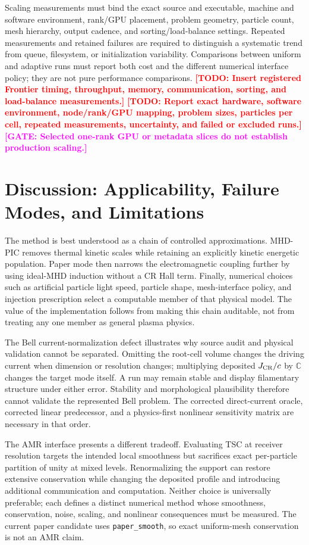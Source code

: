 \documentclass[twocolumn]{aastex701}
\newcommand{\TODO}[1]{\textcolor{red}{\textbf{[TODO: #1]}}}
\newcommand{\GATE}[1]{\textcolor{magenta}{\textbf{[GATE: #1]}}}
\begin{document}
Scaling measurements must bind the exact source and executable, machine and
software environment, rank/GPU placement, problem geometry, particle count,
mesh hierarchy, output cadence, and sorting/load-balance settings. Repeated
measurements and retained failures are required to distinguish a systematic
trend from queue, filesystem, or initialization variability. Comparisons
between uniform and adaptive runs must report both cost and the different
numerical interface policy; they are not pure performance comparisons.
\TODO{Insert registered Frontier timing, throughput, memory, communication,
sorting, and load-balance measurements.}
\TODO{Report exact hardware, software environment, node/rank/GPU mapping,
problem sizes, particles per cell, repeated measurements, uncertainty, and
failed or excluded runs.}
\GATE{Selected one-rank GPU or metadata slices do not establish production
scaling.}

\section{Discussion: Applicability, Failure Modes, and Limitations}
\label{sec:discussion}

The method is best understood as a chain of controlled approximations. MHD-PIC
removes thermal kinetic scales while retaining an explicitly kinetic energetic
population. Paper mode then narrows the electromagnetic coupling further by
using ideal-MHD induction without a CR Hall term. Finally, numerical choices
such as artificial particle light speed, particle shape, mesh-interface
policy, and injection prescription select a computable member of that physical
model. The value of the implementation follows from making this chain
auditable, not from treating any one member as general plasma physics.

The Bell current-normalization defect illustrates why source audit and physical
validation cannot be separated. Omitting the root-cell volume changes the
driving current when dimension or resolution changes; multiplying deposited
$J_{\rm CR}/c$ by $\mathbb{C}$ changes the target mode itself. A run may remain
stable and display filamentary structure under either error. Stability and
morphological plausibility therefore cannot validate the represented Bell
problem. The corrected direct-current oracle, corrected linear predecessor,
and a physics-first nonlinear sensitivity matrix are necessary in that order.

The AMR interface presents a different tradeoff. Evaluating TSC at receiver
resolution targets the intended local smoothness but sacrifices exact
per-particle partition of unity at mixed levels. Renormalizing the support can
restore extensive conservation while changing the deposited profile and
introducing additional communication and computation. Neither choice is
universally preferable; each defines a distinct numerical method whose
smoothness, conservation, noise, scaling, and nonlinear consequences must be
measured. The current paper candidate uses \texttt{paper\_smooth}, so exact
uniform-mesh conservation is not an AMR claim.
\end{document}
